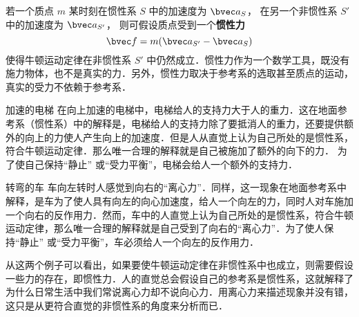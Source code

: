 

若一个质点 $m$ 某时刻在惯性系 $S$ 中的加速度为 $\bvec a_{S}$， 在另一个非惯性系 $S'$ 中的加速度为 $\bvec a_{S'}$， 则可假设质点受到一个\textbf{惯性力}
\begin{equation}\label{Iner_eq1}
\bvec f = m( \bvec a_{S'} - \bvec a_{S} )
\end{equation}
使得牛顿运动定律在非惯性系 $S'$ 中仍然成立．惯性力作为一个数学工具，既没有施力物体，也不是真实的力．另外，惯性力取决于参考系的选取甚至质点的运动，真实的受力不依赖于参考系．

\begin{example}{加速的电梯}\label{Iner_ex1}
在向上加速的电梯中，电梯给人的支持力大于人的重力．这在地面参考系（惯性系）中的解释是，电梯给人的支持力除了要抵消人的重力，还要提供额外的向上的力使人产生向上的加速度．但是人从直觉上认为自己所处的是惯性系，符合牛顿运动定律．那么唯一合理的解释就是自己被施加了额外的向下的力． 为了使自己保持“静止” 或“受力平衡”，电梯会给人一个额外的支持力．
\end{example}

\begin{example}{转弯的车}
车向左转时人感觉到向右的“离心力”．同样，这一现象在地面参考系中解释，是车为了使人具有向左的向心加速度，给人一个向左的力，同时人对车施加一个向右的反作用力．然而，车中的人直觉上认为自己所处的是惯性系，符合牛顿运动定律，那么唯一合理的解释就是自己受到了向右的“离心力”．为了使人保持“静止” 或“受力平衡”，车必须给人一个向左的反作用力．
\end{example}

从这两个例子可以看出，如果要使牛顿运动定律在非惯性系中也成立，则需要假设一些力的存在，即惯性力．人的直觉总会假设自己的参考系是惯性系，这就解释了为什么日常生活中我们常说离心力却不说向心力．用离心力来描述现象并没有错，这只是从更符合直觉的非惯性系的角度来分析而已．


